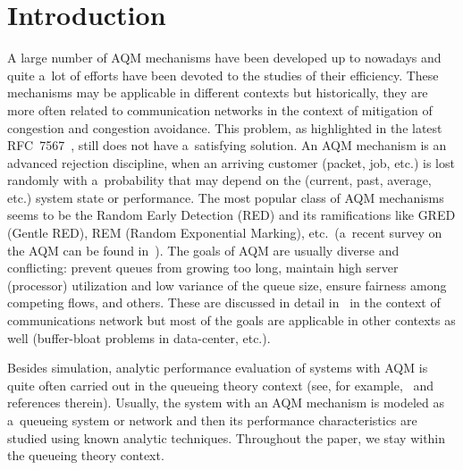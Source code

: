 


\vspace*{1pt}



      \thispagestyle{myheadings}

      \begin{multicols}{2}

                  \label{st\stat}


\section{Introduction}

\noindent
A large number of AQM mechanisms have been developed
up to nowadays and quite a~lot of efforts have been devoted to the studies of
their efficiency. 
These mechanisms may be applicable in different contexts but historically, 
they are more often related to communication networks
in the context of mitigation of congestion and congestion avoidance.
This problem, as highlighted in the latest RFC~7567~\cite{RFC7567},
still does not have a~satisfying solution. 
An AQM mechanism is an advanced rejection discipline, 
when an arriving customer (packet, job, etc.) is lost randomly with a~probability 
that may depend on the (current, past, average, etc.) system state or performance.
The most popular class of AQM mechanisms seems to be the Random Early Detection (RED) and
its ramifications like GRED (Gentle RED), REM 
(Random Exponential Marking),
etc.\ (a~recent survey on the AQM can be found in~\cite{Adams}).
The goals of AQM are usually diverse and conflicting: 
prevent queues from growing too long, maintain high server (processor) utilization
and low variance of the queue size, ensure fairness among competing flows, 
and others. These are discussed in detail in~\cite{RFC7567} in the context
of communications network but most of the goals are applicable in other contexts as well
(buffer-bloat problems in data-center, etc.).

Besides simulation, analytic performance evaluation of systems with AQM is quite often
carried out in the queueing theory context (see,
for example,~\cite{Bonald,Chyd,Chyd2,oleg,hao,konnew} and references therein). 
Usually, the system with an AQM mechanism is modeled as a~queueing system or network
and then its performance characteristics are studied using known analytic techniques. 
Throughout the paper, we stay within the queueing theory context.


\end{multicols}
